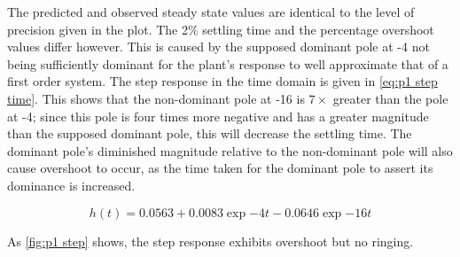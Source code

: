 
The predicted and observed steady state values are identical to the level of precision given in the plot. The 2\% settling time and the percentage overshoot values differ however. This is caused by the supposed dominant pole at -4 not being sufficiently dominant for the plant's response to well approximate that of a first order system. The step response in the time domain is given in \cref{eq:p1 step time}. This shows that the non-dominant pole at -16 is $7\times$ greater than the pole at -4; since this pole is four times more negative and has a greater magnitude than the supposed dominant pole, this will decrease the settling time. The dominant pole's diminished magnitude relative to the non-dominant pole will also cause overshoot to occur, as the time taken for the dominant pole to assert its dominance is increased.

\begin{equation}
	\label{eq:p1 step time}
	h(t) = 0.0563 + 0.0083\exp{-4t} -0.0646\exp{-16t}
\end{equation}



As \cref{fig:p1 step} shows, the step response exhibits overshoot but no ringing.